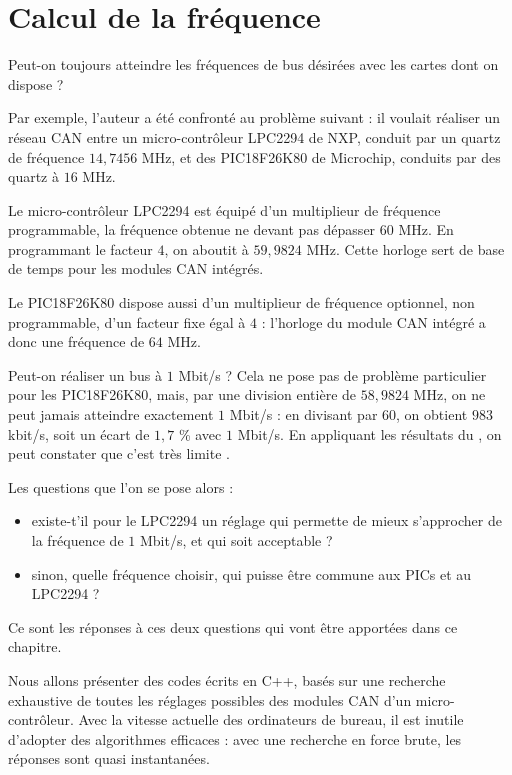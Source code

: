 

\chapter{Calcul de la fréquence}

\thispagestyle{empty}

Peut-on toujours atteindre les fréquences de bus désirées avec les cartes dont on dispose ?

Par exemple, l'auteur a été confronté au problème suivant : il voulait réaliser un réseau CAN entre un micro-contrôleur LPC2294 de NXP, conduit par un quartz de fréquence $14,7456$ MHz, et des PIC18F26K80 de Microchip, conduits par des quartz à $16$ MHz.

Le micro-contrôleur LPC2294 est équipé d'un multiplieur de fréquence programmable, la fréquence obtenue ne devant pas dépasser $60$ MHz. En programmant le facteur $4$, on aboutit à $59,9824$ MHz. Cette horloge sert de base de temps pour les modules CAN intégrés. 

Le PIC18F26K80 dispose aussi d'un multiplieur de fréquence optionnel, non programmable, d'un facteur fixe égal à $4$ : l'horloge du module CAN intégré a donc une fréquence de $64$ MHz.

Peut-on réaliser un bus à $1$ Mbit/s ? Cela ne pose pas de problème particulier pour les PIC18F26K80, mais, par une division entière de $58,9824$ MHz, on ne peut jamais atteindre exactement $1$ Mbit/s : en divisant par $60$, on obtient $983$ kbit/s, soit un écart de $1,7$ \% avec $1$ Mbit/s. En appliquant les résultats du , on peut constater que c'est très limite \pasFini.

Les questions que l'on se pose alors :
\begin{itemize}
  \item existe-t'il pour le LPC2294 un réglage qui permette de mieux s'approcher de la fréquence de $1$ Mbit/s, et qui soit acceptable ?
  \item sinon, quelle fréquence choisir, qui puisse être commune aux PICs et au LPC2294 ?
\end{itemize}

Ce sont les réponses à ces deux questions qui vont être apportées dans ce chapitre.

Nous allons présenter des codes écrits en C++, basés sur une recherche exhaustive de toutes les réglages possibles des modules CAN d'un micro-contrôleur. Avec la vitesse actuelle des ordinateurs de bureau, il est inutile d'adopter des algorithmes efficaces : avec une recherche en force brute, les réponses sont quasi instantanées.





